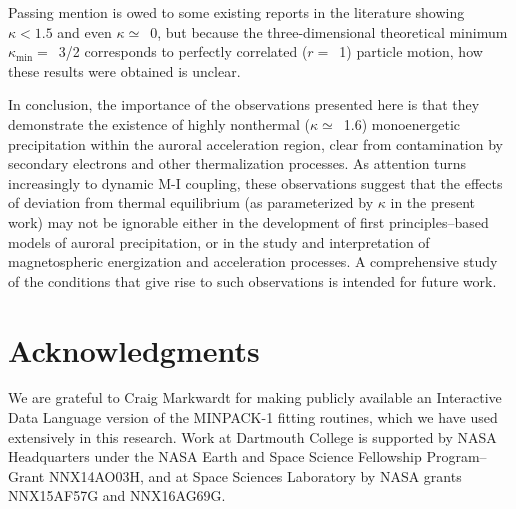   Passing mention is owed to some existing reports in the literature showing
  $\kappa < 1.5$ and even $\kappa \simeq$~0, but because the three-dimensional
  theoretical minimum $\kappa_{\mathrm{min}} =$~3/2 corresponds to perfectly
  correlated ($r =$~1) particle motion, how these results were obtained is
  unclear.

  In conclusion, the importance of the observations presented here is that they
  demonstrate the existence of highly nonthermal ($\kappa \simeq$~1.6)
  monoenergetic precipitation within the auroral acceleration region, clear from
  contamination by secondary electrons and other thermalization processes. As
  attention turns increasingly to dynamic M-I coupling, these observations
  suggest that the effects of deviation from thermal equilibrium (as
  parameterized by $\kappa$ in the present work) may not be ignorable either in
  the development of first principles--based models of auroral precipitation, or
  in the study and interpretation of magnetospheric energization and
  acceleration processes. A comprehensive study of the conditions that give rise
  to such observations is intended for future work.



  
  \section*{Acknowledgments}

  We are grateful to Craig Markwardt for making publicly available an
  Interactive Data Language version of the MINPACK-1 fitting routines, which we
  have used extensively in this research. Work at Dartmouth College is supported
  by NASA Headquarters under the NASA Earth and Space Science Fellowship
  Program--Grant NNX14AO03H, and at Space Sciences Laboratory by NASA grants
  NNX15AF57G and NNX16AG69G.



